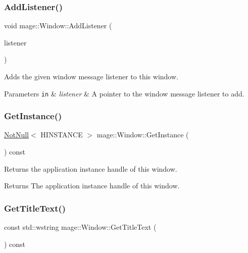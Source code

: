 \subsubsection{\texorpdfstring{Add\+Listener()}{AddListener()}}
{\footnotesize\ttfamily void mage\+::\+Window\+::\+Add\+Listener (\begin{DoxyParamCaption}\item[{\mbox{\hyperlink{classmage_1_1_window_a0e0a4f2a3f6db176f6aec454b94a06fb}{Window\+Message\+Listener\+Ptr}}}]{listener }\end{DoxyParamCaption})}

Adds the given window message listener to this window.


\begin{DoxyParams}[1]{Parameters}
\mbox{\tt in}  & {\em listener} & A pointer to the window message listener to add. \\
\hline
\end{DoxyParams}
\mbox{\label{classmage_1_1_window_a809eff149af9fd2e66eec176078d0127}} 
\subsubsection{\texorpdfstring{Get\+Instance()}{GetInstance()}}
{\footnotesize\ttfamily \mbox{\hyperlink{namespacemage_a8769f9d670d6b585ea306cb1062af94b}{Not\+Null}}$<$ H\+I\+N\+S\+T\+A\+N\+CE $>$ mage\+::\+Window\+::\+Get\+Instance (\begin{DoxyParamCaption}{ }\end{DoxyParamCaption}) const\hspace{0.3cm}{\ttfamily [noexcept]}}

Returns the application instance handle of this window.

\begin{DoxyReturn}{Returns}
The application instance handle of this window. 
\end{DoxyReturn}
\mbox{\label{classmage_1_1_window_a151cab52659daf96bdcf5bf89985d7b8}} 
\subsubsection{\texorpdfstring{Get\+Title\+Text()}{GetTitleText()}}
{\footnotesize\ttfamily const std\+::wstring mage\+::\+Window\+::\+Get\+Title\+Text (\begin{DoxyParamCaption}{ }\end{DoxyParamCaption}) const\hspace{0.3cm}{\ttfamily [noexcept]}}

